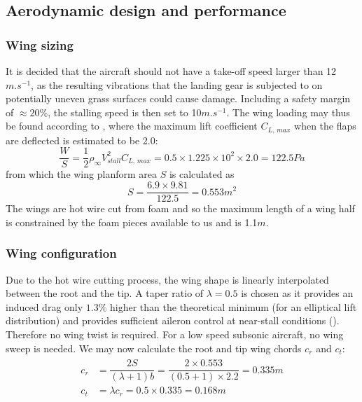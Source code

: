 \subsection{Aerodynamic design and performance}
\subsubsection{Wing sizing}
It is decided that the aircraft should not have a take-off speed larger than 12$\si{m.s^{-1}}$, as the resulting vibrations that the landing gear is subjected to on potentially uneven grass surfaces could cause damage. Including a safety margin of $\approx 20\%$, the stalling speed is then set to 10$\si{m.s^{-1}}$. The wing loading may thus be found according to \cite[p. 410]{anderson}, where the maximum lift coefficient $C_{L,\,max}$ when the flaps are deflected is estimated to be 2.0:
\begin{equation}
  \dfrac{W}{S}=\dfrac{1}{2}\rho_{\infty}V_{stall}^2C_{L,\,max}=0.5\times 1.225\times 10^2\times 2.0=122.5\si{Pa}
\end{equation}
from which the wing planform area $S$ is calculated as
\begin{equation}
  S=\dfrac{6.9\times 9.81}{122.5}=0.553\si{m^2}
\end{equation}
The wings are hot wire cut from foam and so the maximum length of a wing half is constrained by the foam pieces available to us and is 1.1$\si{m}$.

\subsubsection{Wing configuration}
Due to the hot wire cutting process, the wing shape is linearly interpolated between the root and the tip. A taper ratio of $\lambda=0.5$ is chosen as it provides an induced drag only $1.3\%$ higher than the theoretical minimum (for an elliptical lift distribution) and provides sufficient aileron control at near-stall conditions (\cite[pp. 422-425]{anderson}). Therefore no wing twist is required. For a low speed subsonic aircraft, no wing sweep is needed. We may now calculate the root and tip wing chords $c_r$ and $c_t$:
\begin{align}
  \begin{split}
    c_r&=\dfrac{2S}{(\lambda +1)b}=\dfrac{2\times 0.553}{(0.5+1)\times 2.2}=0.335\si{m}\\
    c_t&=\lambda c_r=0.5\times 0.335=0.168\si{m}
  \end{split}
\end{align}

